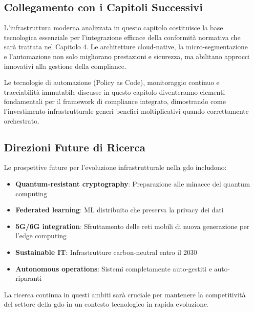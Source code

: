 \subsection{\texorpdfstring{Collegamento con i Capitoli Successivi}{3.10.2 - Collegamento con i Capitoli Successivi}}
\label{subsec:bridge}

L'infrastruttura moderna analizzata in questo capitolo costituisce la base tecnologica essenziale per l'integrazione efficace della conformità normativa che sarà trattata nel Capitolo 4. Le architetture cloud-native, la micro-segmentazione e l'automazione non solo migliorano prestazioni e sicurezza, ma abilitano approcci innovativi alla gestione della compliance.

Le tecnologie di automazione (Policy as Code), monitoraggio continuo e tracciabilità immutabile discusse in questo capitolo diventeranno elementi fondamentali per il framework di compliance integrato, dimostrando come l'investimento infrastrutturale generi benefici moltiplicativi quando correttamente orchestrato\autocite{ISACA2024compliance}.

\subsection{\texorpdfstring{Direzioni Future di Ricerca}{3.10.3 - Direzioni Future di Ricerca}}
\label{subsec:future_research}

Le prospettive future per l'evoluzione infrastrutturale nella \gls{gdo} includono:

\begin{itemize}
    \item \textbf{Quantum-resistant cryptography}: Preparazione alle minacce del quantum computing
    \item \textbf{Federated learning}: ML distribuito che preserva la privacy dei dati
    \item \textbf{5G/6G integration}: Sfruttamento delle reti mobili di nuova generazione per l'edge computing
    \item \textbf{Sustainable IT}: Infrastrutture carbon-neutral entro il 2030
    \item \textbf{Autonomous operations}: Sistemi completamente auto-gestiti e auto-riparanti
\end{itemize}

La ricerca continua in questi ambiti sarà cruciale per mantenere la competitività del settore della \gls{gdo} in un contesto tecnologico in rapida evoluzione.


\clearpage
